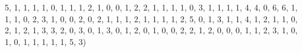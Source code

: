 \documentclass[
]{book}
\newenvironment{Shaded}{\begin{snugshade}}{\end{snugshade}}
\newcommand{\DecValTok}[1]{\textcolor[rgb]{0.00,0.00,0.81}{#1}}
\newcommand{\NormalTok}[1]{#1}
\theoremstyle{definition}
\theoremstyle{definition}
\theoremstyle{definition}
\theoremstyle{definition}
\theoremstyle{remark}
\begin{document}
\begin{Shaded}
\begin{Highlighting}[]
\DecValTok{5}\NormalTok{, }\DecValTok{1}\NormalTok{, }\DecValTok{1}\NormalTok{, }\DecValTok{1}\NormalTok{, }\DecValTok{1}\NormalTok{, }\DecValTok{0}\NormalTok{, }\DecValTok{1}\NormalTok{, }\DecValTok{1}\NormalTok{, }\DecValTok{1}\NormalTok{, }\DecValTok{2}\NormalTok{, }\DecValTok{1}\NormalTok{, }\DecValTok{0}\NormalTok{, }\DecValTok{0}\NormalTok{, }\DecValTok{1}\NormalTok{, }\DecValTok{2}\NormalTok{, }\DecValTok{2}\NormalTok{, }
\DecValTok{1}\NormalTok{, }\DecValTok{1}\NormalTok{, }\DecValTok{1}\NormalTok{, }\DecValTok{1}\NormalTok{, }\DecValTok{0}\NormalTok{, }\DecValTok{3}\NormalTok{, }\DecValTok{1}\NormalTok{, }\DecValTok{1}\NormalTok{, }\DecValTok{1}\NormalTok{, }\DecValTok{1}\NormalTok{, }\DecValTok{4}\NormalTok{, }\DecValTok{4}\NormalTok{, }\DecValTok{0}\NormalTok{, }\DecValTok{6}\NormalTok{, }\DecValTok{6}\NormalTok{, }\DecValTok{1}\NormalTok{, }
\DecValTok{1}\NormalTok{, }\DecValTok{1}\NormalTok{, }\DecValTok{0}\NormalTok{, }\DecValTok{2}\NormalTok{, }\DecValTok{3}\NormalTok{, }\DecValTok{1}\NormalTok{, }\DecValTok{0}\NormalTok{, }\DecValTok{0}\NormalTok{, }\DecValTok{2}\NormalTok{, }\DecValTok{0}\NormalTok{, }\DecValTok{2}\NormalTok{, }\DecValTok{1}\NormalTok{, }\DecValTok{1}\NormalTok{, }\DecValTok{1}\NormalTok{, }\DecValTok{2}\NormalTok{, }\DecValTok{1}\NormalTok{, }
\DecValTok{1}\NormalTok{, }\DecValTok{1}\NormalTok{, }\DecValTok{1}\NormalTok{, }\DecValTok{2}\NormalTok{, }\DecValTok{5}\NormalTok{, }\DecValTok{0}\NormalTok{, }\DecValTok{1}\NormalTok{, }\DecValTok{3}\NormalTok{, }\DecValTok{1}\NormalTok{, }\DecValTok{1}\NormalTok{, }\DecValTok{4}\NormalTok{, }\DecValTok{1}\NormalTok{, }\DecValTok{2}\NormalTok{, }\DecValTok{1}\NormalTok{, }\DecValTok{1}\NormalTok{, }\DecValTok{0}\NormalTok{, }
\DecValTok{2}\NormalTok{, }\DecValTok{1}\NormalTok{, }\DecValTok{2}\NormalTok{, }\DecValTok{1}\NormalTok{, }\DecValTok{3}\NormalTok{, }\DecValTok{3}\NormalTok{, }\DecValTok{2}\NormalTok{, }\DecValTok{0}\NormalTok{, }\DecValTok{3}\NormalTok{, }\DecValTok{0}\NormalTok{, }\DecValTok{1}\NormalTok{, }\DecValTok{3}\NormalTok{, }\DecValTok{0}\NormalTok{, }\DecValTok{1}\NormalTok{, }\DecValTok{2}\NormalTok{, }\DecValTok{0}\NormalTok{, }
\DecValTok{1}\NormalTok{, }\DecValTok{0}\NormalTok{, }\DecValTok{0}\NormalTok{, }\DecValTok{2}\NormalTok{, }\DecValTok{2}\NormalTok{, }\DecValTok{1}\NormalTok{, }\DecValTok{2}\NormalTok{, }\DecValTok{0}\NormalTok{, }\DecValTok{0}\NormalTok{, }\DecValTok{0}\NormalTok{, }\DecValTok{1}\NormalTok{, }\DecValTok{1}\NormalTok{, }\DecValTok{2}\NormalTok{, }\DecValTok{3}\NormalTok{, }\DecValTok{1}\NormalTok{, }\DecValTok{0}\NormalTok{, }
\DecValTok{1}\NormalTok{, }\DecValTok{0}\NormalTok{, }\DecValTok{1}\NormalTok{, }\DecValTok{1}\NormalTok{, }\DecValTok{1}\NormalTok{, }\DecValTok{1}\NormalTok{, }\DecValTok{1}\NormalTok{, }\DecValTok{5}\NormalTok{, }\DecValTok{3}\NormalTok{)}

\end{Highlighting}
\end{Shaded}
\end{document}
